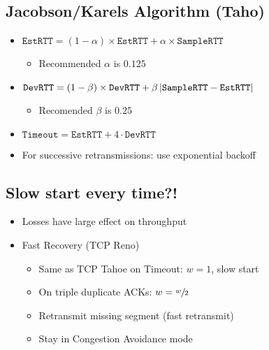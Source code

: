 \subsection{Jacobson/Karels Algorithm (Taho)}
\begin{itemize}[nosep]
    \item $\texttt{EstRTT} = (1 - \alpha)\times\texttt{EstRTT} + \alpha\times\texttt{SampleRTT}$
          \begin{itemize}[nosep]
              \item Recommended $\alpha$ is $0.125$
          \end{itemize}
    \item $\texttt{DevRTT} = (1 - \beta)\times\texttt{DevRTT} + \beta\left\lvert\texttt{SampleRTT} - \texttt{EstRTT}\right\rvert$
          \begin{itemize}[nosep]
              \item Recomended $\beta$ is $0.25$
          \end{itemize}
    \item $\texttt{Timeout} = \texttt{EstRTT} + 4\cdot\texttt{DevRTT}$
    \item For successive retransmissions: use exponential backoff
\end{itemize}
\subsection{Slow start every time?!}
\begin{itemize}[nosep]
    \item Losses have large effect on throughput
    \item Fast Recovery (TCP Reno)
          \begin{itemize}[nosep]
              \item Same as TCP Tahoe on Timeout: $w=1$, slow start
              \item On triple duplicate ACKs: $w = \sfrac{w}{2}$
              \item Retransmit missing segment (fast retransmit)
              \item Stay in Congestion Avoidance mode
          \end{itemize}
\end{itemize}

